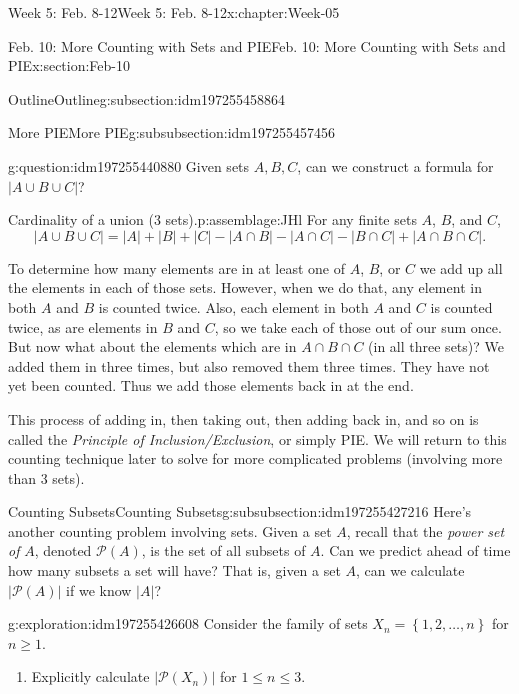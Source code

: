 \documentclass[oneside,10pt,]{book}
\numberwithin{equation}{section}
\renewcommand{\le}{\leqslant}
\renewcommand{\ge}{\geqslant}
\newcommand{\set}[1]{\left\{ {#1} \right\}}
\def\pow{{\mathcal P}}
\newcommand{\pow}{\mathcal P}
\newcommand{\card}[1]{\left| #1 \right|}
\begin{document}
\begin{chapterptx}{Week 5: Feb. 8-12}{}{Week 5: Feb. 8-12}{}{}{x:chapter:Week-05}
\begin{sectionptx}{Feb. 10: More Counting with Sets and PIE}{}{Feb. 10: More Counting with Sets and PIE}{}{}{x:section:Feb-10}
\begin{subsectionptx}{Outline}{}{Outline}{}{}{g:subsection:idm197255458864}
\begin{subsubsectionptx}{More PIE}{}{More PIE}{}{}{g:subsubsection:idm197255457456}
\begin{question}{}{g:question:idm197255440880}%
Given sets \(A, B, C\), can we construct a formula for \(\card{A\cup B\cup C}\)?%
\end{question}
\begin{assemblage}{Cardinality of a union (3 sets).}{p:assemblage:JHl}%
For any finite sets \(A\), \(B\), and \(C\),%
\begin{equation*}
\card{A \cup B \cup C} = \card{A} + \card{B} + \card{C} - \card{A \cap B} - \card{A \cap C} - \card{B \cap C} + \card{A \cap B \cap C}\text{.}
\end{equation*}
%
\end{assemblage}
To determine how many elements are in at least one of \(A\), \(B\), or \(C\) we add up all the elements in each of those sets. However, when we do that, any element in both \(A\) and \(B\) is counted twice. Also, each element in both \(A\) and \(C\) is counted twice, as are elements in \(B\) and \(C\), so we take each of those out of our sum once. But now what about the elements which are in \(A \cap B \cap C\) (in all three sets)? We added them in three times, but also removed them three times. They have not yet been counted. Thus we add those elements back in at the end.%
\par
This process of adding in, then taking out, then adding back in, and so on is called the \emph{Principle of Inclusion\slash{}Exclusion}, or simply PIE. We will return to this counting technique later to solve for more complicated problems (involving more than 3 sets).%
\end{subsubsectionptx}
%
%
\typeout{************************************************}
\typeout{************************************************}
%
\begin{subsubsectionptx}{Counting Subsets}{}{Counting Subsets}{}{}{g:subsubsection:idm197255427216}
Here's another counting problem involving sets. Given a set \(A\), recall that the \emph{power set of} \(A\), denoted \(\pow(A)\), is the set of all subsets of \(A\). Can we predict ahead of time how many subsets a set will have? That is, given a set \(A\), can we calculate \(\card{\pow(A)}\) if we know \(\card{A}\)?%
\begin{exploration}{}{g:exploration:idm197255426608}%
Consider the family of sets \(X_n = \set{1,2,\ldots,n}\) for \(n\ge 1\).%
%
\begin{enumerate}
\item{}Explicitly calculate \(\card{\pow(X_n)}\) for \(1 \le n \le 3\).%

\end{enumerate}
\end{exploration}
\end{subsubsectionptx}
\end{subsectionptx}
\end{sectionptx}
\end{chapterptx}
\end{document}
